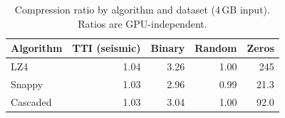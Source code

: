 \begin{table}[htbp]
\centering
\caption{Compression ratio by algorithm and dataset (4\,GB input). Ratios are GPU-independent.}
\label{tab:compression_ratio}
\begin{tabular}{lrrrr}
\toprule
Algorithm & TTI (seismic) & Binary & Random & Zeros \\
\midrule
LZ4 & 1.04 & 3.26 & 1.00 & 245 \\
Snappy & 1.03 & 2.96 & 0.99 & 21.3 \\
Cascaded & 1.03 & 3.04 & 1.00 & 92.0 \\
\bottomrule
\end{tabular}
\end{table}
